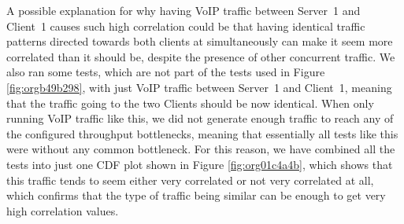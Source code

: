 \documentclass[a4paper,11pt]{article}
\begin{document}
A possible explanation for why having VoIP traffic between Server~1 and Client~1 causes such high correlation could be that having identical traffic patterns directed towards both clients at simultaneously can make it seem more correlated than it should be, despite the presence of other concurrent traffic. We also ran some tests, which are not part of the tests used in Figure \ref{fig:orgb49b298}, with just VoIP traffic between Server~1 and Client~1, meaning that the traffic going to the two Clients should be now identical. When only running VoIP traffic like this, we did not generate enough traffic to reach any of the configured throughput bottlenecks, meaning that essentially all tests like this were without any common bottleneck. For this reason, we have combined all the tests into just one CDF plot shown in Figure \ref{fig:org01c4a4b}, which shows that this traffic tends to seem either very correlated or not very correlated at all, which confirms that the type of traffic being similar can be enough to get very high correlation values.
\end{document}
